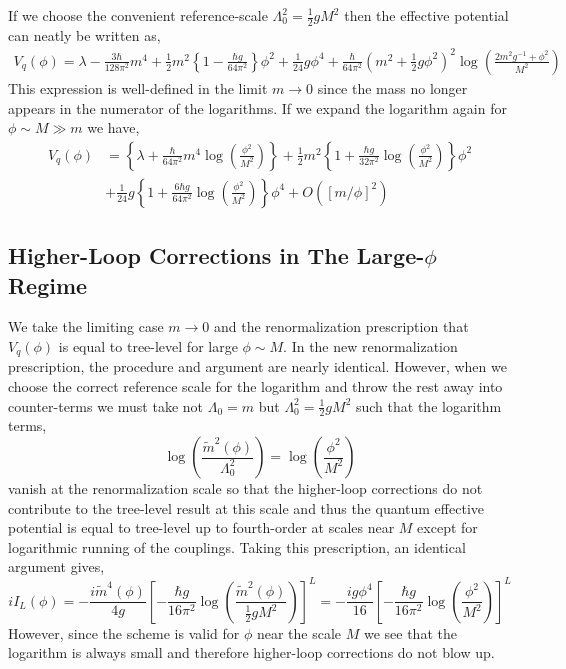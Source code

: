 \documentclass[12pt]{article}
\begin{document}
If we choose the convenient reference-scale $\Lambda_0^2 = \tfrac{1}{2} g M^2$ then the effective potential can neatly be written as,
\begin{align*}
V_q(\phi) = \lambda - \frac{3 \hbar}{128 \pi^2} m^4 + \frac{1}{2} m^2 \left\{1 - \frac{\hbar g}{64 \pi^2} \right\} \phi^2 + \frac{1}{24} g \phi^4 + \frac{\hbar}{64 \pi^2} \left(m^2 + \tfrac{1}{2} g \phi^2 \right)^2 \log{\left( \frac{2 m^2 g^{-1} + \phi^2}{M^2} \right)} 
\end{align*}
This expression is well-defined in the limit $m \to 0$ since the mass no longer appears in the numerator of the logarithms. If we expand the logarithm again for $\phi \sim M \gg m$ we have,
\begin{align*}
V_q(\phi) & = \left\{ \lambda + \frac{\hbar}{64 \pi^2}  m^4 \log{\left( \frac{\phi^2}{M^2} \right)} \right\} + \frac{1}{2} m^2 \left\{ 1 + \frac{\hbar g}{32\pi^2} \log{\left( \frac{\phi^2}{M^2} \right)} \right\} \phi^2 
\\
& + \frac{1}{24} g \left\{1 + \frac{6 \hbar g}{64 \pi^2} \log{\left( \frac{\phi^2}{M^2} \right)} \right\} \phi^4 + O([m/\phi]^2)
\end{align*}

\subsection{Higher-Loop Corrections in The Large-$\phi$ Regime}

We take the limiting case $m \to 0$ and the renormalization prescription that $V_q(\phi)$ is equal to tree-level for large $\phi \sim M$. 
In the new renormalization prescription, the procedure and argument are nearly identical. However, when we choose the correct reference scale for the logarithm and throw the rest away into counter-terms we must take not $\Lambda_0 = m$ but $\Lambda_0^2 = \tfrac{1}{2} g M^2$ such that the logarithm terms,
\[ \log{\left( \frac{\tilde{m}^2(\phi)}{\Lambda_0^2} \right)} = \log{\left( \frac{\phi^2}{M^2} \right) } \]
vanish at the renormalization scale so that the higher-loop corrections do not contribute to the tree-level result at this scale and thus the quantum effective potential is equal to tree-level up to fourth-order at scales near $M$ except for logarithmic running of the couplings. Taking this prescription, an identical argument gives,
\[ iI_L(\phi) = -\frac{i \tilde{m}^4(\phi)}{4 g} \left[ -\frac{\hbar g}{16 \pi^2} \log{\left( \frac{\tilde{m}^2(\phi)}{\tfrac{1}{2} g M^2} \right)} \right]^L = - \frac{i g \phi^4}{16} \left[ -\frac{\hbar g}{16 \pi^2} \log{\left( \frac{\phi^2}{M^2} \right)} \right]^L  \] 
However, since the scheme is valid for $\phi$ near the scale $M$ we see that the logarithm is always small and therefore higher-loop corrections do not blow up. 
\end{document}
